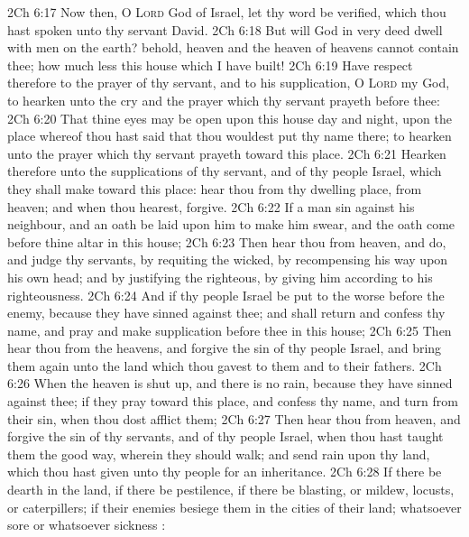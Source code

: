 \vs 2Ch 6:17 Now then, O \textsc{Lord} God of Israel, let thy word be verified, which thou hast spoken unto thy servant David.
\vs 2Ch 6:18 But will God in very deed dwell with men on the earth? behold, heaven and the heaven of heavens cannot contain thee; how much less this house which I have built!
\vs 2Ch 6:19 Have respect therefore to the prayer of thy servant, and to his supplication, O \textsc{Lord} my God, to hearken unto the cry and the prayer which thy servant prayeth before thee:
\vs 2Ch 6:20 That thine eyes may be open upon this house day and night, upon the place whereof thou hast said that thou wouldest put thy name there; to hearken unto the prayer which thy servant prayeth toward this place.
\vs 2Ch 6:21 Hearken therefore unto the supplications of thy servant, and of thy people Israel, which they shall make toward this place: hear thou from thy dwelling place,  from heaven; and when thou hearest, forgive.
\vs 2Ch 6:22 If a man sin against his neighbour, and an oath be laid upon him to make him swear, and the oath come before thine altar in this house;
\vs 2Ch 6:23 Then hear thou from heaven, and do, and judge thy servants, by requiting the wicked, by recompensing his way upon his own head; and by justifying the righteous, by giving him according to his righteousness.
\vs 2Ch 6:24 And if thy people Israel be put to the worse before the enemy, because they have sinned against thee; and shall return and confess thy name, and pray and make supplication before thee in this house;
\vs 2Ch 6:25 Then hear thou from the heavens, and forgive the sin of thy people Israel, and bring them again unto the land which thou gavest to them and to their fathers.
\vs 2Ch 6:26 When the heaven is shut up, and there is no rain, because they have sinned against thee;  if they pray toward this place, and confess thy name, and turn from their sin, when thou dost afflict them;
\vs 2Ch 6:27 Then hear thou from heaven, and forgive the sin of thy servants, and of thy people Israel, when thou hast taught them the good way, wherein they should walk; and send rain upon thy land, which thou hast given unto thy people for an inheritance.
\vs 2Ch 6:28 If there be dearth in the land, if there be pestilence, if there be blasting, or mildew, locusts, or caterpillers; if their enemies besiege them in the cities of their land; whatsoever sore or whatsoever sickness :
